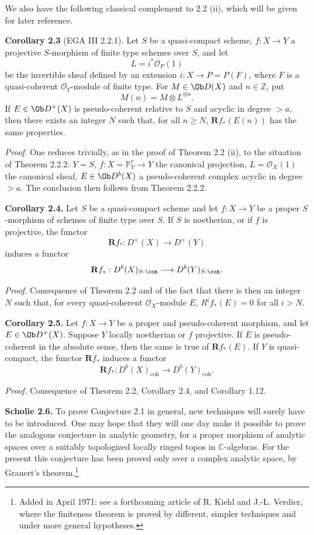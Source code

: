 We also have the following classical complement to 2.2 (ii), which will be given for later reference.

\textbf{Corollary 2.3} (EGA III 2.2.1). Let \(S\) be a quasi-compact scheme, \(f:X\to Y\) a projective \(S\)-morphism of finite type schemes over \(S\), and let
\[
  L=i^*\mathcal O_P(1)
\]
be the invertible sheaf defined by an extension \(i:X\to P=P(F)\), where \(F\) is a quasi-coherent \(\mathcal O_Y\)-module of finite type. For \(M\in \Ob D(X)\) and \(n\in\mathbb Z\), put
\[
  M(n)=M\otimes L^{\otimes n}.
\]
If \(E\in \Ob D^+(X)\) is pseudo-coherent relative to \(S\) and acyclic in degree \(>a\), then there exists an integer \(N\) such that, for all \(n\geq N\), \(\mathbf Rf_*(E(n))\) has the same properties.

\emph{Proof.} One reduces trivially, as in the proof of Theorem 2.2 (ii), to the situation of Theorem 2.2.2: \(Y=S\), \(f:X=\mathbb P^r_Y\to Y\) the canonical projection, \(L=\mathcal O_X(1)\) the canonical sheaf, \(E\in\Ob D^b(X)\) a pseudo-coherent complex acyclic in degree \(>a\). The conclusion then follows from Theorem 2.2.2.

\textbf{Corollary 2.4.} Let \(S\) be a quasi-compact scheme and let \(f:X\to Y\) be a proper \(S\)-morphism of schemes of finite type over \(S\). If \(S\) is noetherian, or if \(f\) is projective, the functor
\[
  \mathbf Rf_*:D^+(X)\longrightarrow D^+(Y)
\]
induces a functor
\[
  \mathbf Rf_*:D^b(X)_{S\text{-}\coh}\longrightarrow D^b(Y)_{S\text{-}\coh}.
\]

\emph{Proof.} Consequence of Theorem 2.2 and of the fact that there is then an integer \(N\) such that, for every quasi-coherent \(\mathcal O_X\)-module \(E\), \(R^if_*(E)=0\) for all \(i>N\).

\textbf{Corollary 2.5.} Let \(f:X\to Y\) be a proper and pseudo-coherent morphism, and let \(E\in \Ob D^+(X)\). Suppose \(Y\) locally noetherian or \(f\) projective. If \(E\) is pseudo-coherent in the absolute sense, then the same is true of \(\mathbf Rf_*(E)\). If \(Y\) is quasi-compact, the functor \(\mathbf Rf_*\) induces a functor
\[
  \mathbf Rf_*:D^b(X)_{\mathrm{coh}}\longrightarrow D^b(Y)_{\mathrm{coh}}.
\]

\emph{Proof.} Consequence of Theorem 2.2, Corollary 2.4, and Corollary 1.12.

\textbf{Scholie 2.6.} To prove Conjecture 2.1 in general, new techniques will surely have to be introduced. One may hope that they will one day make it possible to prove the analogous conjecture in analytic geometry, for a proper morphism of analytic spaces over a suitably topologized locally ringed topos in \(\mathbb C\)-algebras. For the present this conjecture has been proved only over a complex analytic space, by Grauert's theorem.\footnote{Added in April 1971: see a forthcoming article of R. Kiehl and J.-L. Verdier, where the finiteness theorem is proved by different, simpler techniques and under more general hypotheses.}

